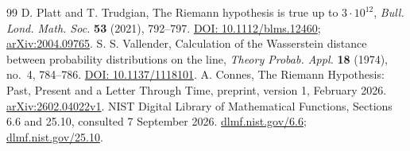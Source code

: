 \documentclass[11pt]{amsart}
\numberwithin{equation}{section}
\theoremstyle{plain}
\theoremstyle{definition}
\theoremstyle{remark}
\begin{document}
\begin{thebibliography}{99}
D. Platt and T. Trudgian,
The Riemann hypothesis is true up to $3\cdot10^{12}$,
\emph{Bull. Lond. Math. Soc.} \textbf{53} (2021), 792--797.
\href{https://doi.org/10.1112/blms.12460}{DOI: 10.1112/blms.12460};
\href{https://arxiv.org/abs/2004.09765}{arXiv:2004.09765}.
S. S. Vallender,
Calculation of the Wasserstein distance between probability distributions on
the line, \emph{Theory Probab. Appl.} \textbf{18} (1974), no.~4, 784--786.
\href{https://doi.org/10.1137/1118101}{DOI: 10.1137/1118101}.
A. Connes,
The Riemann Hypothesis: Past, Present and a Letter Through Time,
preprint, version 1, February 2026.
\href{https://arxiv.org/abs/2602.04022v1}{arXiv:2602.04022v1}.
NIST Digital Library of Mathematical Functions,
Sections 6.6 and 25.10, consulted 7 September 2026.
\href{https://dlmf.nist.gov/6.6}{dlmf.nist.gov/6.6};
\href{https://dlmf.nist.gov/25.10}{dlmf.nist.gov/25.10}.
\end{thebibliography}
\end{document}
